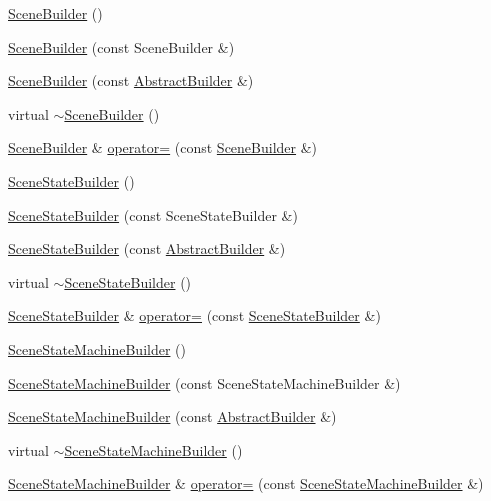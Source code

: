 \begin{DoxyCompactItemize}
\item 
\hyperlink{namespacejli_a416f25c3329cd3e760e1a184b62e7223}{Scene\+Builder} ()
\item 
\hyperlink{namespacejli_a08327fcbf8005b89aa48e20217b34adc}{Scene\+Builder} (const Scene\+Builder \&)
\item 
\hyperlink{namespacejli_a2f38a2d72a581791a6deeebca04d5daf}{Scene\+Builder} (const \hyperlink{classjli_1_1_abstract_builder}{Abstract\+Builder} \&)
\item 
virtual \hyperlink{namespacejli_a99a07c08fdc61e92c99f5a47bc3430fa}{$\sim$\+Scene\+Builder} ()
\item 
\hyperlink{namespacejli_a416f25c3329cd3e760e1a184b62e7223}{Scene\+Builder} \& \hyperlink{namespacejli_ab76ae2c8b17665d1e78209f9c76653e8}{operator=} (const \hyperlink{namespacejli_a416f25c3329cd3e760e1a184b62e7223}{Scene\+Builder} \&)
\item 
\hyperlink{namespacejli_a5aaf57d6bd221dbd37ed8b83b4d01221}{Scene\+State\+Builder} ()
\item 
\hyperlink{namespacejli_ac1a324bfb2057ad5c3d4e0df01281bc5}{Scene\+State\+Builder} (const Scene\+State\+Builder \&)
\item 
\hyperlink{namespacejli_a18f97bb2adb991c20378394cc9436091}{Scene\+State\+Builder} (const \hyperlink{classjli_1_1_abstract_builder}{Abstract\+Builder} \&)
\item 
virtual \hyperlink{namespacejli_a68d344865337c3c551b47ba4f6697568}{$\sim$\+Scene\+State\+Builder} ()
\item 
\hyperlink{namespacejli_a5aaf57d6bd221dbd37ed8b83b4d01221}{Scene\+State\+Builder} \& \hyperlink{namespacejli_acfc1b87286f73159f3be9dc98ea9ff3e}{operator=} (const \hyperlink{namespacejli_a5aaf57d6bd221dbd37ed8b83b4d01221}{Scene\+State\+Builder} \&)
\item 
\hyperlink{namespacejli_a6ce600ca511a9b17260a65755187d2a4}{Scene\+State\+Machine\+Builder} ()
\item 
\hyperlink{namespacejli_acc2357cb4124107669f4f2cca7c988bb}{Scene\+State\+Machine\+Builder} (const Scene\+State\+Machine\+Builder \&)
\item 
\hyperlink{namespacejli_a9bd569c1fe915cad67bb747198eeb9e7}{Scene\+State\+Machine\+Builder} (const \hyperlink{classjli_1_1_abstract_builder}{Abstract\+Builder} \&)
\item 
virtual \hyperlink{namespacejli_a8dc12ec2d6776b6fb9c8c6d8bb6a6aba}{$\sim$\+Scene\+State\+Machine\+Builder} ()
\item 
\hyperlink{namespacejli_a6ce600ca511a9b17260a65755187d2a4}{Scene\+State\+Machine\+Builder} \& \hyperlink{namespacejli_aa3c2ac8964227e35ebca5e842bd54e77}{operator=} (const \hyperlink{namespacejli_a6ce600ca511a9b17260a65755187d2a4}{Scene\+State\+Machine\+Builder} \&)

\end{DoxyCompactItemize}

